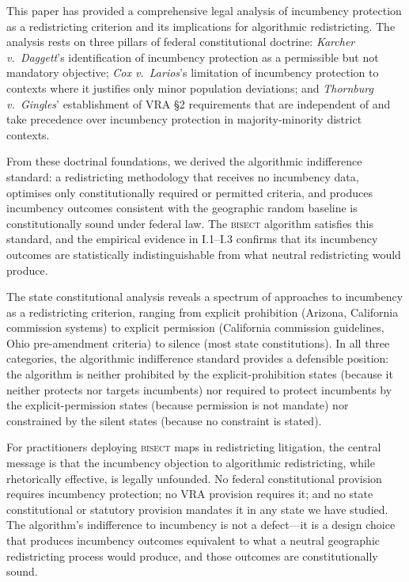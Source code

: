 \label{sec:conclusion}

This paper has provided a comprehensive legal analysis of incumbency protection as a
redistricting criterion and its implications for algorithmic redistricting. The analysis
rests on three pillars of federal constitutional doctrine: \textit{Karcher v.\ Daggett}'s
identification of incumbency protection as a permissible but not mandatory objective;
\textit{Cox v.\ Larios}'s limitation of incumbency protection to contexts where it
justifies only minor population deviations; and \textit{Thornburg v.\ Gingles}'
establishment of VRA \S{}2 requirements that are independent of and take precedence
over incumbency protection in majority-minority district contexts.

From these doctrinal foundations, we derived the algorithmic indifference standard:
a redistricting methodology that receives no incumbency data, optimises only constitutionally
required or permitted criteria, and produces incumbency outcomes consistent with the
geographic random baseline is constitutionally sound under federal law. The \textsc{bisect}
algorithm satisfies this standard, and the empirical evidence in I.1--I.3 confirms that
its incumbency outcomes are statistically indistinguishable from what neutral redistricting
would produce.

The state constitutional analysis reveals a spectrum of approaches to incumbency as
a redistricting criterion, ranging from explicit prohibition (Arizona, California
commission systems) to explicit permission (California commission guidelines, Ohio
pre-amendment criteria) to silence (most state constitutions). In all three categories,
the algorithmic indifference standard provides a defensible position: the algorithm
is neither prohibited by the explicit-prohibition states (because it neither protects
nor targets incumbents) nor required to protect incumbents by the explicit-permission
states (because permission is not mandate) nor constrained by the silent states (because
no constraint is stated).

For practitioners deploying \textsc{bisect} maps in redistricting litigation, the
central message is that the incumbency objection to algorithmic redistricting, while
rhetorically effective, is legally unfounded. No federal constitutional provision
requires incumbency protection; no VRA provision requires it; and no state constitutional
or statutory provision mandates it in any state we have studied. The algorithm's
indifference to incumbency is not a defect---it is a design choice that produces
incumbency outcomes equivalent to what a neutral geographic redistricting process would
produce, and those outcomes are constitutionally sound.

